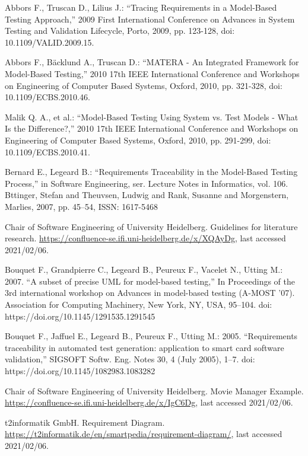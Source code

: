 \documentclass[a4paper,10pt, bibliography=totocnumbered]{scrreprt}
\begin{document}
\begin{thebibliography}{9}
 Abbors F., Truscan D., Lilius J.: \enquote{Tracing Requirements in a Model-Based Testing Approach,} 2009 First International Conference on Advances in System Testing and Validation Lifecycle, Porto, 2009, pp. 123-128, doi: 10.1109/VALID.2009.15.

 Abbors F., Bäcklund A., Truscan D.: \enquote{MATERA - An Integrated Framework for Model-Based Testing,} 2010 17th IEEE International Conference and Workshops on Engineering of Computer Based Systems, Oxford, 2010, pp. 321-328, doi: 10.1109/ECBS.2010.46.

 Malik Q. A., et al.: \enquote{Model-Based Testing Using System vs. Test Models - What Is the Difference?,} 2010 17th IEEE International Conference and Workshops on Engineering of Computer Based Systems, Oxford, 2010, pp. 291-299, doi: 10.1109/ECBS.2010.41.

 Bernard E., Legeard B.: \enquote{Requirements Traceability in the Model-Based Testing Process,}  in Software Engineering, ser. Lecture Notes in Informatics, vol. 106. Bttinger, Stefan and Theuvsen, Ludwig and Rank, Susanne and Morgenstern, Marlies, 2007, pp. 45–54, ISSN: 1617-5468

 Chair of Software Engineering of University Heidelberg. Guidelines for literature research.
\url{https://confluence-se.ifi.uni-heidelberg.de/x/XQAyDg}, last accessed 2021/02/06. 

 Bouquet F., Grandpierre C., Legeard B., Peureux F., Vacelet N., Utting M.: 2007. \enquote{A subset of precise UML for model-based testing,} In Proceedings of the 3rd international workshop on Advances in model-based testing (A-MOST '07). Association for Computing Machinery, New York, NY, USA, 95–104. doi: https://doi.org/10.1145/1291535.1291545

 Bouquet F., Jaffuel E., Legeard B., Peureux F., Utting M.: 2005. \enquote{Requirements traceability in automated test generation: application to smart card software validation,} SIGSOFT Softw. Eng. Notes 30, 4 (July 2005), 1–7. doi: https://doi.org/10.1145/1082983.1083282

 Chair of Software Engineering of University Heidelberg. Movie Manager Example. 
\url{https://confluence-se.ifi.uni-heidelberg.de/x/IgC6Dg}, last accessed 2021/02/06. 

 t2informatik GmbH. Requirement Diagram.
\url{https://t2informatik.de/en/smartpedia/requirement-diagram/}, last accessed 2021/02/06. 


\end{thebibliography}
\end{document}
